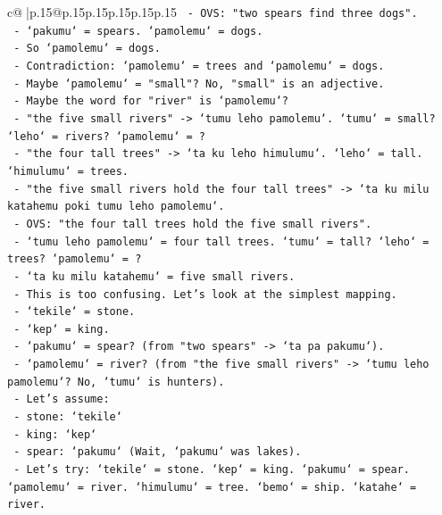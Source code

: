 \documentclass{article}
\begin{document}
{\begin{supertabular}{c@{$\;$}|p{.15\linewidth}@{}p{.15\linewidth}p{.15\linewidth}p{.15\linewidth}p{.15\linewidth}p{.15\linewidth}}
{{{\texttt{          {-} OVS: "two spears find three dogs".} \\
\texttt{          {-} `pakumu` = spears. `pamolemu` = dogs.} \\
\texttt{          {-} So `pamolemu` = dogs.} \\
\texttt{        {-} Contradiction: `pamolemu` = trees and `pamolemu` = dogs.} \\
\texttt{        {-} Maybe `pamolemu` = "small"? No, "small" is an adjective.} \\
\texttt{        {-} Maybe the word for "river" is `pamolemu`?} \\
\texttt{        {-} "the five small rivers" {-}> `tumu leho pamolemu`. `tumu` = small? `leho` = rivers? `pamolemu` = ?} \\
\texttt{        {-} "the four tall trees" {-}> `ta ku leho himulumu`. `leho` = tall. `himulumu` = trees.} \\
\texttt{        {-} "the five small rivers hold the four tall trees" {-}> `ta ku milu katahemu poki tumu leho pamolemu`.} \\
\texttt{          {-} OVS: "the four tall trees hold the five small rivers".} \\
\texttt{          {-} `tumu leho pamolemu` = four tall trees. `tumu` = tall? `leho` = trees? `pamolemu` = ?} \\
\texttt{          {-} `ta ku milu katahemu` = five small rivers.} \\
\texttt{          {-} This is too confusing. Let's look at the simplest mapping.} \\
\texttt{          {-} `tekile` = stone.} \\
\texttt{          {-} `kep` = king.} \\
\texttt{          {-} `pakumu` = spear? (from "two spears" {-}> `ta pa pakumu`).} \\
\texttt{          {-} `pamolemu` = river? (from "the five small rivers" {-}> `tumu leho pamolemu`? No, `tumu` is hunters).} \\
\texttt{          {-} Let's assume:} \\
\texttt{            {-} stone: `tekile`} \\
\texttt{            {-} king: `kep`} \\
\texttt{            {-} spear: `pakumu` (Wait, `pakumu` was lakes).} \\
\texttt{            {-} Let's try: `tekile` = stone. `kep` = king. `pakumu` = spear. `pamolemu` = river. `himulumu` = tree. `bemo` = ship. `katahe` = river.} \\
}}}
\end{supertabular}}
\end{document}
